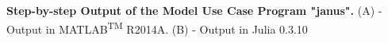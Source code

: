 \textbf{Step-by-step Output of the Model Use Case Program "janus".} (A) - Output in MATLAB\textsuperscript{TM} R2014A. (B) - Output in Julia 0.3.10